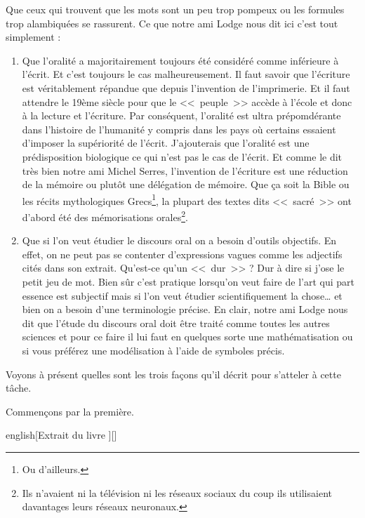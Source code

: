 Que ceux qui trouvent que les mots sont un peu trop pompeux ou les
formules trop alambiquées se rassurent. Ce que notre ami Lodge nous
dit ici c'est tout simplement :
\begin{enumerate}
\item Que l'oralité a majoritairement toujours été considéré comme
  inférieure à l'écrit. Et c'est toujours le cas malheureusement. Il
  faut savoir que l'écriture est véritablement répandue que depuis
  l'invention de l'imprimerie. Et il faut attendre le 19ème siècle
  pour que le <<~peuple~>> accède à l'école et donc à la lecture et
  l'écriture. Par conséquent, l'oralité est ultra prépomdérante dans
  l'histoire de l'humanité y compris dans les pays où certains
  essaient d'imposer la supériorité de l'écrit. J'ajouterais que
  l'oralité est une prédisposition biologique ce qui n'est pas le cas
  de l'écrit. Et comme le dit très bien notre ami Michel Serres,
  l'invention de l'écriture est une réduction de la mémoire ou plutôt
  une délégation de mémoire. Que ça soit la Bible ou les récits
  mythologiques Grecs\footnote{Ou d'ailleurs.}, la plupart des textes
  dits <<~sacré~>> ont d'abord été des mémorisations
  orales\footnote{Ils n'avaient ni la télévision ni les réseaux
    sociaux du coup ils utilisaient davantages leurs réseaux
    neuronaux.}.
\item Que si l'on veut étudier le discours oral on a besoin d'outils
  objectifs. En effet, on ne peut pas se contenter d'expressions
  vagues comme les adjectifs cités dans son extrait. Qu'est-ce qu'un
  \son <<~dur~>> ? Dur à dire si j'ose le petit jeu de mot. Bien sûr
  c'est pratique lorsqu'on veut faire de l'art qui part essence est
  subjectif mais si l'on veut étudier scientifiquement la chose\dots{}
  et bien on a besoin d'une terminologie précise. En clair, notre ami
  Lodge nous dit que l'étude du discours oral doit être traité comme
  toutes les autres sciences et pour ce faire il lui faut en quelques
  sorte une mathématisation ou si vous préférez une modélisation à
  l'aide de symboles précis.
\end{enumerate}

Voyons à présent quelles sont les trois façons qu'il décrit pour
s'atteler à cette tâche.

Commençons par la première.

\begin{foreigndisplayquote}{english}[Extrait du livre \lodge][]
\end{foreigndisplayquote}

